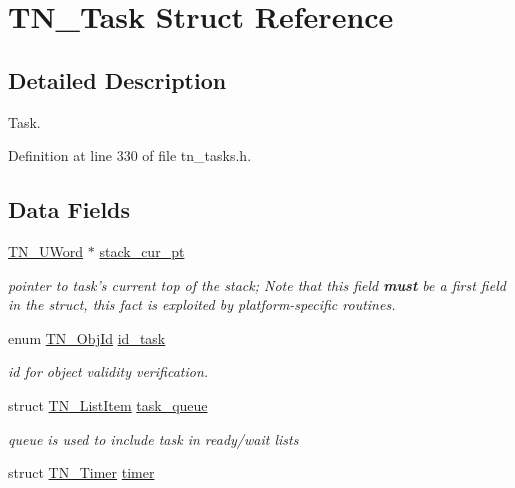 \hypertarget{structTN__Task}{\section{T\+N\+\_\+\+Task Struct Reference}
\label{structTN__Task}
}


\subsection{Detailed Description}
Task. 

Definition at line 330 of file tn\+\_\+tasks.\+h.

\subsection*{Data Fields}
\begin{DoxyCompactItemize}
\item 
\hyperlink{tn__arch__example_8h_ab80cba0fe9ffcd9011d53dfeb9e39bf4}{T\+N\+\_\+\+U\+Word} $\ast$ \hyperlink{structTN__Task_a9354fa4b328e10ee9f8adb032e643892}{stack\+\_\+cur\+\_\+pt}
\begin{DoxyCompactList}\small\item\em pointer to task's current top of the stack; Note that this field {\bfseries must} be a first field in the struct, this fact is exploited by platform-\/specific routines. \end{DoxyCompactList}\item 
enum \hyperlink{tn__common_8h_ae779dd1f6735f6e139fb70acd004d976}{T\+N\+\_\+\+Obj\+Id} \hyperlink{structTN__Task_a014a0a70ae6a23d08b1571ac6b017abd}{id\+\_\+task}
\begin{DoxyCompactList}\small\item\em id for object validity verification. \end{DoxyCompactList}\item 
\hypertarget{structTN__Task_a0772dfcd1f95d0ba10b9d2820fb9201b}{struct \hyperlink{structTN__ListItem}{T\+N\+\_\+\+List\+Item} \hyperlink{structTN__Task_a0772dfcd1f95d0ba10b9d2820fb9201b}{task\+\_\+queue}}\label{structTN__Task_a0772dfcd1f95d0ba10b9d2820fb9201b}

\begin{DoxyCompactList}\small\item\em queue is used to include task in ready/wait lists \end{DoxyCompactList}\item 
\hypertarget{structTN__Task_ac394d7ba177bab077969e9d96cddd8fb}{struct \hyperlink{structTN__Timer}{T\+N\+\_\+\+Timer} \hyperlink{structTN__Task_ac394d7ba177bab077969e9d96cddd8fb}{timer}}\label{structTN__Task_ac394d7ba177bab077969e9d96cddd8fb}


\end{DoxyCompactItemize}

